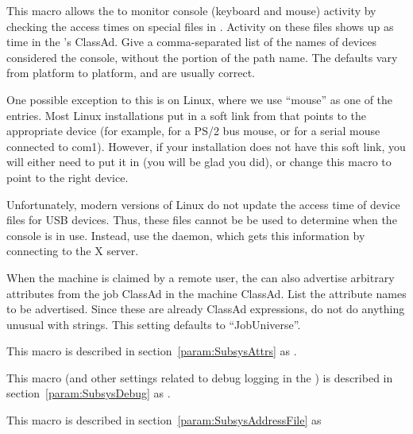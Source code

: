 \begin{description}
\label{param:ConsoleDevices}
\item[\Macro{CONSOLE\_DEVICES}]
  This macro allows the  to monitor console (keyboard and mouse)
  activity by checking the access times on special files in
  .  Activity on these files shows up as 
  time in the 's ClassAd.  Give a comma-separated list of
  the names of devices considered the console, without the
   portion of the path name.  The defaults vary from
  platform to platform, and are usually correct.  

  One possible exception to this is on Linux, where
  we use ``mouse'' as
  one of the entries.  Most Linux installations put in a
  soft link from  that points to the appropriate
  device (for example,  for a PS/2 bus mouse, or
   for a serial mouse connected to com1).  However,
  if your installation does not have this soft link, you will either
  need to put it in (you will be glad you did), or change this
  macro to point to the right device. 
  
  Unfortunately, modern versions of Linux do not update the access time of
  device files for USB devices. Thus, these files cannot be be used to
  determine when the console is in use. Instead, use the  daemon,
  which gets this information by connecting to the X server.
  
\label{param:StartdJobExprs}
\item[\Macro{STARTD\_JOB\_EXPRS}]
  When the machine is claimed by a remote user,
  the  can also advertise
  arbitrary attributes from the job ClassAd in the machine ClassAd.
  List the attribute names to be advertised.  \Note Since
  these are already ClassAd expressions, do not do anything
  unusual with strings.   
  This setting defaults to ``JobUniverse''.

\label{param:StartdAttrs}
\item[\Macro{STARTD\_ATTRS}]
  This macro is described in section~\ref{param:SubsysAttrs} as
  .

\label{param:StartdDebug}
\item[\Macro{STARTD\_DEBUG}]
  This macro
  (and other settings related to debug logging in the ) is
  described in section~\ref{param:SubsysDebug} as
  .

\label{param:StartdAddressFile}
\item[\Macro{STARTD\_ADDRESS\_FILE}]
  This macro is described in section~\ref{param:SubsysAddressFile} as


\end{description}

